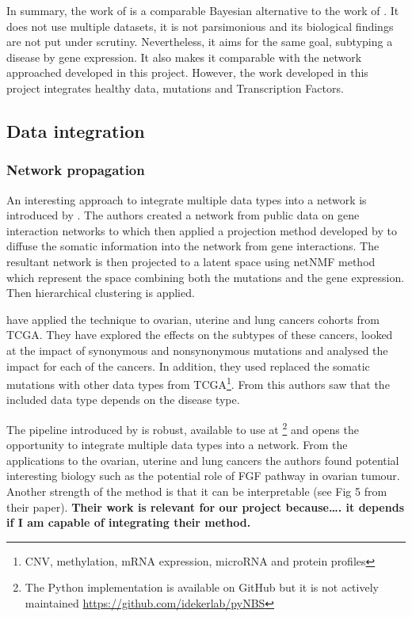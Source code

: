 In summary, the work of \citet{Nakazawa2021-yq} is a comparable Bayesian alternative to the work of \citet{Care2019-ij}. It does not use multiple datasets, it is not parsimonious and its biological findings are not put under scrutiny. Nevertheless, it aims for the same goal, subtyping a disease by gene expression. It also makes it comparable with the network approached developed in this project. However, the work developed in this project integrates healthy data, mutations and Transcription Factors.




\subsection{Data integration} \label{s:lit:net_data_int}
\subsubsection{Network propagation} \label{s:lit:net_prop}

An interesting approach to integrate multiple data types into a network is introduced by  \citet{Hofree2013-ld}. The authors created a network from public data on gene interaction networks \cite{Szklarczyk2019-pu, Cerami2011-ql, Lee2011-xj} to which then applied a projection method developed by \citet{Vanunu2010-el} to diffuse the somatic information into the network from gene interactions. The resultant network is then projected to a latent space using netNMF method \citet{Cai2008-fv} which represent the space combining both the mutations and the gene expression. Then hierarchical clustering is applied.

\citet{Hofree2013-ld} have applied the technique to ovarian, uterine and lung cancers cohorts from TCGA. They have explored the effects on the subtypes of these cancers, looked at the impact of synonymous and nonsynonymous mutations and analysed the impact for each of the cancers. In addition, they used replaced the somatic mutations with other data types from TCGA\footnote{CNV, methylation, mRNA expression, microRNA and protein profiles}. From this authors saw that the included data type depends on the disease type.

The pipeline introduced by \citet{Hofree2013-ld} is robust, available to use at \footnote{The Python implementation is available on GitHub but it is not actively maintained \url{https://github.com/idekerlab/pyNBS}} and opens the opportunity to integrate multiple data types into a network. From the applications to the ovarian, uterine and lung cancers the authors found potential interesting biology such as the potential role of FGF pathway in ovarian tumour. Another strength of the method is that it can be interpretable (see Fig 5 from their paper). \textbf{Their work is relevant for our project because…. it depends if I am capable of integrating their method.}


